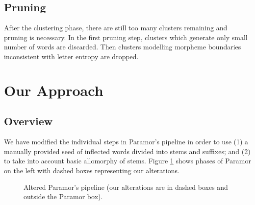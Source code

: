 \documentclass{itatnew}
\begin{document}
\subsection{Pruning}

\noindent
After the clustering phase, there are still too many clusters remaining and pruning is necessary. In the first pruning step, clusters which generate only small number of words are discarded. 
Then clusters modelling morpheme boundaries inconsistent with letter entropy are dropped.

%

\section{Our Approach}

\subsection{Overview}


\noindent
We have modified the individual steps in Paramor's pipeline in order to use (1) a manually provided seed of inflected words divided into stems and suffixes; and (2) to take into account basic allomorphy of stems.
%
Figure \ref{fig:overview} shows phases of Paramor on the left with dashed boxes representing our alterations.


\begin{figure}

\caption{Altered Paramor's pipeline (our alterations are in dashed boxes and outside the Paramor box).}
\label{fig:overview}
\end{figure}
\end{document}
